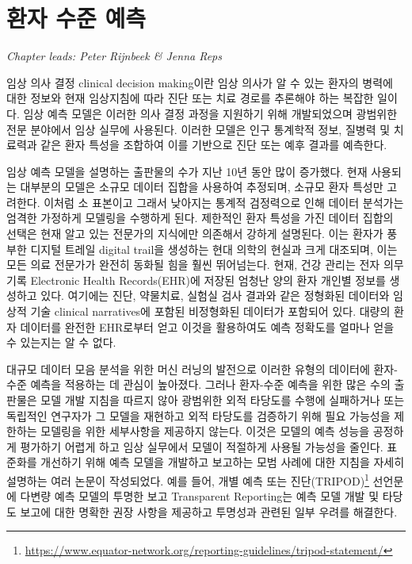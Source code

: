 \documentclass[10.5pt]{book}
\let\rmarkdownfootnote\footnote%
\def\footnote{\protect\rmarkdownfootnote}
\theoremstyle{definition}
\theoremstyle{definition}
\theoremstyle{definition}
\theoremstyle{remark}
\begin{document}
\chapter{환자 수준 예측}\label{PatientLevelPrediction}

\emph{Chapter leads: Peter Rijnbeek \& Jenna Reps}


임상 의사 결정 clinical decision making이란 임상 의사가 알 수 있는
환자의 병력에 대한 정보와 현재 임상지침에 따라 진단 또는 치료 경로를
추론해야 하는 복잡한 일이다. 임상 예측 모델은 이러한 의사 결정 과정을
지원하기 위해 개발되었으며 광범위한 전문 분야에서 임상 실무에 사용된다.
이러한 모델은 인구 통계학적 정보, 질병력 및 치료력과 같은 환자 특성을
조합하여 이를 기반으로 진단 또는 예후 결과를 예측한다.
 

임상 예측 모델을 설명하는 출판물의 수가 지난 10년 동안 많이 증가했다.
현재 사용되는 대부분의 모델은 소규모 데이터 집합을 사용하여 추정되며,
소규모 환자 특성만 고려한다. 이처럼 소 표본이고 그래서 낮아지는 통계적
검정력으로 인해 데이터 분석가는 엄격한 가정하게 모델링을 수행하게 된다.
제한적인 환자 특성을 가진 데이터 집합의 선택은 현재 알고 있는 전문가의
지식에만 의존해서 강하게 설명된다. 이는 환자가 풍부한 디지털 트레일
digital trail을 생성하는 현대 의학의 현실과 크게 대조되며, 이는 모든
의료 전문가가 완전히 동화될 힘을 훨씬 뛰어넘는다. 현재, 건강 관리는 전자
의무 기록 Electronic Health Records(EHR)에 저장된 엄청난 양의 환자
개인별 정보를 생성하고 있다. 여기에는 진단, 약물치료, 실험실 검사 결과와
같은 정형화된 데이터와 임상적 기술 clinical narratives에 포함된
비정형화된 데이터가 포함되어 있다. 대량의 환자 데이터를 완전한 EHR로부터
얻고 이것을 활용하여도 예측 정확도를 얼마나 얻을 수 있는지는 알 수 없다.

대규모 데이터 모음 분석을 위한 머신 러닝의 발전으로 이러한 유형의
데이터에 환자-수준 예측을 적용하는 데 관심이 높아졌다. 그러나 환자-수준
예측을 위한 많은 수의 출판물은 모델 개발 지침을 따르지 않아 광범위한
외적 타당도를 수행에 실패하거나 또는 독립적인 연구자가 그 모델을
재현하고 외적 타당도를 검증하기 위해 필요 가능성을 제한하는 모델링을
위한 세부사항을 제공하지 않는다. 이것은 모델의 예측 성능을 공정하게
평가하기 어렵게 하고 임상 실무에서 모델이 적절하게 사용될 가능성을
줄인다. 표준화를 개선하기 위해 예측 모델을 개발하고 보고하는 모범 사례에
대한 지침을 자세히 설명하는 여러 논문이 작성되었다. 예를 들어, 개별 예측
또는 진단(TRIPOD)\footnote{\url{https://www.equator-network.org/reporting-guidelines/tripod-statement/}}
선언문에 다변량 예측 모델의 투명한 보고 Transparent Reporting는 예측
모델 개발 및 타당도 보고에 대한 명확한 권장 사항을 제공하고 투명성과
관련된 일부 우려를 해결한다.  
\end{document}
